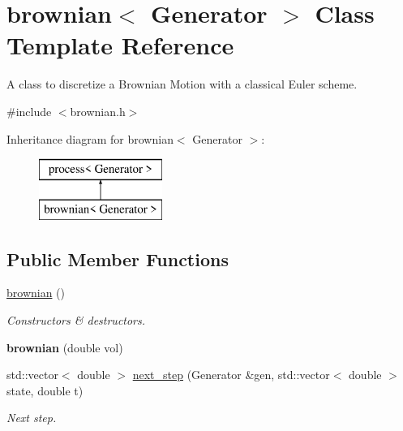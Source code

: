 \hypertarget{classbrownian}{}\section{brownian$<$ Generator $>$ Class Template Reference}
\label{classbrownian}


A class to discretize a Brownian Motion with a classical Euler scheme.  




{\ttfamily \#include $<$brownian.\+h$>$}

Inheritance diagram for brownian$<$ Generator $>$\+:\begin{figure}[H]
\begin{center}
\leavevmode
\includegraphics[height=2.000000cm]{classbrownian}
\end{center}
\end{figure}
\subsection*{Public Member Functions}
\begin{DoxyCompactItemize}
\item 
\mbox{\hyperlink{classbrownian_ab606472ba893b778b1ad3f57553354e3}{brownian}} ()
\begin{DoxyCompactList}\small\item\em Constructors \& destructors. \end{DoxyCompactList}\item 
\mbox{\label{classbrownian_a11a807d65dafc80cadd54ab010db996a}} 
{\bfseries brownian} (double vol)
\item 
\mbox{\label{classbrownian_afb58e5d64bc76193fcce54cf611f3671}} 
std\+::vector$<$ double $>$ \mbox{\hyperlink{classbrownian_afb58e5d64bc76193fcce54cf611f3671}{next\+\_\+step}} (Generator \&gen, std\+::vector$<$ double $>$ state, double t)
\begin{DoxyCompactList}\small\item\em Next step. \end{DoxyCompactList}\end{DoxyCompactItemize}
